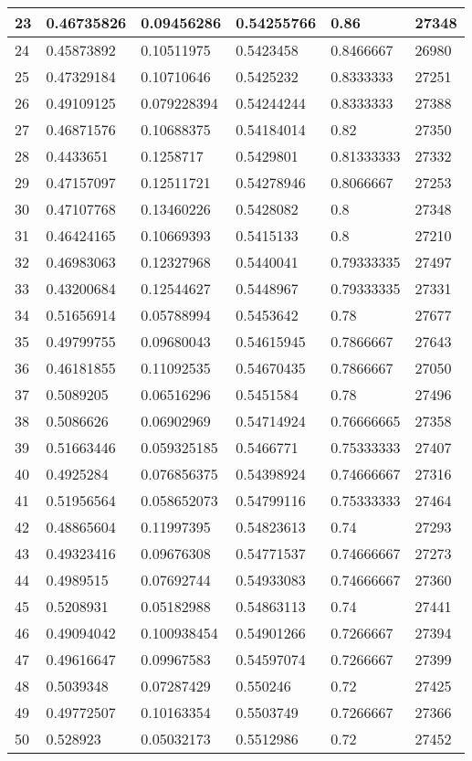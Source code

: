 \begin{longtable}{|l|l|l|l|l|l|}
23 & 0.46735826 & 0.09456286 & 0.54255766 & 0.86 & 27348 \\ \hline 
24 & 0.45873892 & 0.10511975 & 0.5423458 & 0.8466667 & 26980 \\ \hline 
25 & 0.47329184 & 0.10710646 & 0.5425232 & 0.8333333 & 27251 \\ \hline 
26 & 0.49109125 & 0.079228394 & 0.54244244 & 0.8333333 & 27388 \\ \hline 
27 & 0.46871576 & 0.10688375 & 0.54184014 & 0.82 & 27350 \\ \hline 
28 & 0.4433651 & 0.1258717 & 0.5429801 & 0.81333333 & 27332 \\ \hline 
29 & 0.47157097 & 0.12511721 & 0.54278946 & 0.8066667 & 27253 \\ \hline 
30 & 0.47107768 & 0.13460226 & 0.5428082 & 0.8 & 27348 \\ \hline 
31 & 0.46424165 & 0.10669393 & 0.5415133 & 0.8 & 27210 \\ \hline 
32 & 0.46983063 & 0.12327968 & 0.5440041 & 0.79333335 & 27497 \\ \hline 
33 & 0.43200684 & 0.12544627 & 0.5448967 & 0.79333335 & 27331 \\ \hline 
34 & 0.51656914 & 0.05788994 & 0.5453642 & 0.78 & 27677 \\ \hline 
35 & 0.49799755 & 0.09680043 & 0.54615945 & 0.7866667 & 27643 \\ \hline 
36 & 0.46181855 & 0.11092535 & 0.54670435 & 0.7866667 & 27050 \\ \hline 
37 & 0.5089205 & 0.06516296 & 0.5451584 & 0.78 & 27496 \\ \hline 
38 & 0.5086626 & 0.06902969 & 0.54714924 & 0.76666665 & 27358 \\ \hline 
39 & 0.51663446 & 0.059325185 & 0.5466771 & 0.75333333 & 27407 \\ \hline 
40 & 0.4925284 & 0.076856375 & 0.54398924 & 0.74666667 & 27316 \\ \hline 
41 & 0.51956564 & 0.058652073 & 0.54799116 & 0.75333333 & 27464 \\ \hline 
42 & 0.48865604 & 0.11997395 & 0.54823613 & 0.74 & 27293 \\ \hline 
43 & 0.49323416 & 0.09676308 & 0.54771537 & 0.74666667 & 27273 \\ \hline 
44 & 0.4989515 & 0.07692744 & 0.54933083 & 0.74666667 & 27360 \\ \hline 
45 & 0.5208931 & 0.05182988 & 0.54863113 & 0.74 & 27441 \\ \hline 
46 & 0.49094042 & 0.100938454 & 0.54901266 & 0.7266667 & 27394 \\ \hline 
47 & 0.49616647 & 0.09967583 & 0.54597074 & 0.7266667 & 27399 \\ \hline 
48 & 0.5039348 & 0.07287429 & 0.550246 & 0.72 & 27425 \\ \hline 
49 & 0.49772507 & 0.10163354 & 0.5503749 & 0.7266667 & 27366 \\ \hline 
50 & 0.528923 & 0.05032173 & 0.5512986 & 0.72 & 27452 \\ \hline 
\end{longtable}